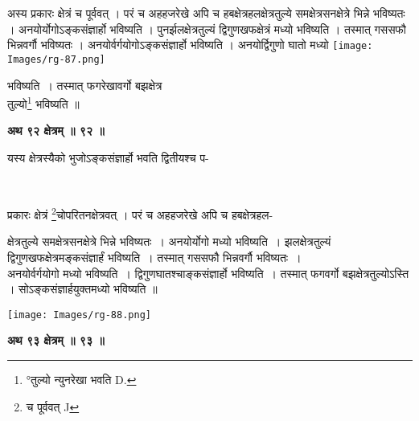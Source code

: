 \documentclass[11pt, openany]{book}
\begin{document}
\begin{vwcol}[widths={0.65,0.35}, sep=.8cm, rule=0pt]
अस्य प्रकारः क्षेत्रं च पूर्ववत् । परं च अहहजरेखे अपि च हबक्षेत्रहलक्षेत्रतुल्ये समक्षेत्रसनक्षेत्रे भिन्ने
भविष्यतः । अनयोर्योगोऽङ्कसंज्ञार्हो भविष्यति । पुनर्झलक्षेत्रतुल्यं द्विगुणखफक्षेत्रं मध्यो भविष्यति । तस्मात् गससफौ भिन्नवर्गौ भविष्यतः । अनयोर्वर्गयोगोऽङ्कसंज्ञार्हो भविष्यति । अनयोर्द्विगुणो घातो मध्यो 
\noindent \texttt{[image: Images/rg-87.png]}\\
\end{vwcol}
\vspace{-8mm}

\noindent  भविष्यति~। तस्मात् फगरेखावर्गो बझक्षेत्र\\
तुल्यो\renewcommand{\thefootnote}{२}\footnote{°तुल्यो न्युनरेखा भवति {\en D.}} भविष्यति ॥ \\
\begin{center}
\textbf{\large अथ ९२ क्षेत्रम् ॥ ९२ ॥}
\end{center}
\vspace{5mm}

{\ab यस्य क्षेत्रस्यैको भुजोऽङ्कसंज्ञार्हो भवति द्वितीयश्च प-}

\newpage
{}\\
\vspace{3mm}

प्रकारः क्षेत्रं \renewcommand{\thefootnote}{१}\footnote{च पूर्ववत् {\en J} }चोपरितनक्षेत्रवत् । परं च अहहजरेखे अपि च हबक्षेत्रहल-
\begin{vwcol}[widths={0.6,0.4}, sep=.8cm, rule=0pt]
क्षेत्रतुल्ये समक्षेत्रसनक्षेत्रे भिन्ने
भविष्यतः~। अनयोर्योगो मध्यो भविष्यति~। झलक्षेत्रतुल्यं द्विगुणखफक्षेत्रमङ्कसंज्ञार्हं भविष्यति~। तस्मात् गससफौ भिन्नवर्गौ भविष्यतः~। \\ \noindent अनयोर्वर्गयोगो मध्यो भविष्यति~। द्विगुणघातश्चाङ्कसंज्ञार्हो
भविष्यति~। तस्मात् फगवर्गो बझक्षेत्रतुल्योऽस्ति । सोऽङ्कसंज्ञार्हयुक्तमध्यो भविष्यति ॥ \\
\vspace{5mm}

\noindent \texttt{[image: Images/rg-88.png]}\\
\end{vwcol}
\vspace{3mm}

\begin{center}
\textbf{\large अथ ९३ क्षेत्रम् ॥ ९३ ॥}
\end{center}
\vspace{5mm}
\end{document}
